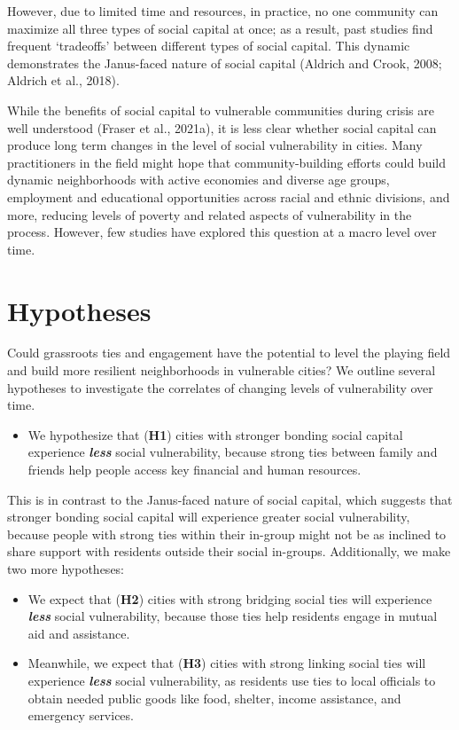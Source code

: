 \documentclass[]{elsarticle} %
\providecommand{\tightlist}{%
  \setlength{\itemsep}{0pt}\setlength{\parskip}{0pt}}
\begin{document}
However, due to limited time and resources, in practice, no one
community can maximize all three types of social capital at once; as a
result, past studies find frequent `tradeoffs' between different types
of social capital. This dynamic demonstrates the Janus-faced nature of
social capital (Aldrich and Crook, 2008; Aldrich et al., 2018).

While the benefits of social capital to vulnerable communities during
crisis are well understood (Fraser et al., 2021a), it is less clear
whether social capital can produce long term changes in the level of
social vulnerability in cities. Many practitioners in the field might
hope that community-building efforts could build dynamic neighborhoods
with active economies and diverse age groups, employment and educational
opportunities across racial and ethnic divisions, and more, reducing
levels of poverty and related aspects of vulnerability in the process.
However, few studies have explored this question at a macro level over
time.

\hypertarget{hypotheses}{%
\section{Hypotheses}\label{hypotheses}}

Could grassroots ties and engagement have the potential to level the
playing field and build more resilient neighborhoods in vulnerable
cities? We outline several hypotheses to investigate the correlates of
changing levels of vulnerability over time.

\begin{itemize}
\tightlist
\item
  We hypothesize that (\textbf{H1}) cities with stronger bonding social
  capital experience \textbf{\emph{less}} social vulnerability, because
  strong ties between family and friends help people access key
  financial and human resources.
\end{itemize}

This is in contrast to the Janus-faced nature of social capital, which
suggests that stronger bonding social capital will experience greater
social vulnerability, because people with strong ties within their
in-group might not be as inclined to share support with residents
outside their social in-groups. Additionally, we make two more
hypotheses:

\begin{itemize}
\item
  We expect that (\textbf{H2}) cities with strong bridging social ties
  will experience \textbf{\emph{less}} social vulnerability, because
  those ties help residents engage in mutual aid and assistance.
\item
  Meanwhile, we expect that (\textbf{H3}) cities with strong linking
  social ties will experience \textbf{\emph{less}} social vulnerability,
  as residents use ties to local officials to obtain needed public goods
  like food, shelter, income assistance, and emergency services.
\end{itemize}
\end{document}
